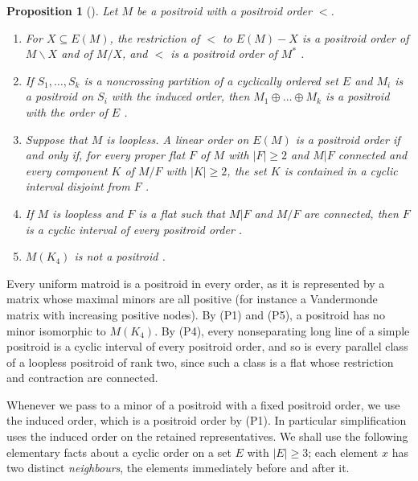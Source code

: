 \documentclass[11pt]{amsart}
\newtheorem{proposition}[theorem]{Proposition}
\theoremstyle{definition}
\theoremstyle{remark}
\numberwithin{equation}{section}
\begin{document}
\begin{proposition}[\cite{ARW16,Bon24}]\label{prop:positroid}
Let $M$ be a positroid with a positroid order $<$.
\begin{enumerate}[label=\textup{(P\arabic*)}]
\item For $X\subseteq E(M)$, the restriction of $<$ to $E(M)-X$ is a positroid order of $M\backslash X$ and of $M/X$, and $<$ is a positroid order of $M^*$ \textup{\cite[Proposition~3.5]{ARW16}}.
\item If $S_1,\dots,S_k$ is a noncrossing partition of a cyclically ordered set $E$ and $M_i$ is a positroid on $S_i$ with the induced order, then $M_1\oplus\dots\oplus M_k$ is a positroid with the order of $E$ \textup{\cite[Theorem~7.6]{ARW16}}.
\item Suppose that $M$ is loopless. A linear order on $E(M)$ is a positroid order if and only if, for every proper flat $F$ of $M$ with $|F|\ge2$ and $M|F$ connected and every component $K$ of $M/F$ with $|K|\ge2$, the set $K$ is contained in a cyclic interval disjoint from $F$ \textup{\cite[Theorem~3.2, (1)$\Leftrightarrow$(4)]{Bon24}}.
\item If $M$ is loopless and $F$ is a flat such that $M|F$ and $M/F$ are connected, then $F$ is a cyclic interval of every positroid order \textup{\cite[Corollary~3.4]{Bon24}}.
\item $M(K_4)$ is not a positroid \textup{\cite[Section~3, after Corollary~3.4]{Bon24}}.
\end{enumerate}
\end{proposition}

Every uniform matroid is a positroid in every order, as it is represented by a matrix whose maximal minors are all positive (for instance a Vandermonde matrix with increasing positive nodes). By (P1) and (P5), a positroid has no minor isomorphic to $M(K_4)$. By (P4), every nonseparating long line of a simple positroid is a cyclic interval of every positroid order, and so is every parallel class of a loopless positroid of rank two, since such a class is a flat whose restriction and contraction are connected.

Whenever we pass to a minor of a positroid with a fixed positroid order, we use the induced order, which is a positroid order by (P1). In particular simplification uses the induced order on the retained representatives. We shall use the following elementary facts about a cyclic order on a set $E$ with $|E|\ge3$; each element $x$ has two distinct \emph{neighbours}, the elements immediately before and after it.
\end{document}
